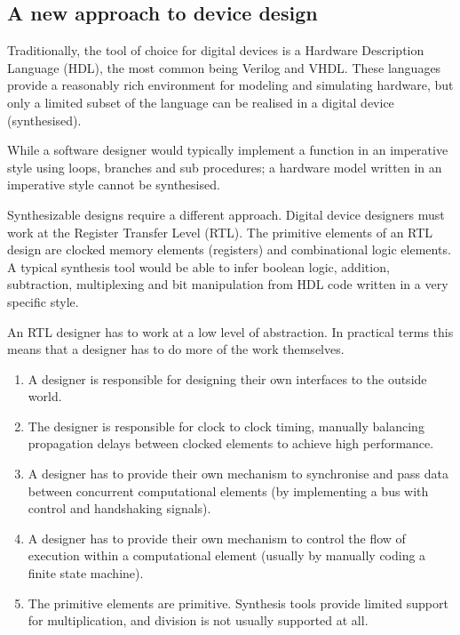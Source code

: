 \documentclass[letterpaper,10pt,english]{sphinxmanual}
\begin{document}
\subsection{A new approach to device design}
\label{introduction/index:a-new-approach-to-device-design}
Traditionally, the tool of choice for digital devices is a Hardware
Description Language (HDL), the most common being Verilog and VHDL. These
languages provide a reasonably rich environment for modeling and simulating
hardware, but only a limited subset of the language can be realised in a
digital device (synthesised).

While a software designer would typically implement a function in an
imperative style using loops, branches and sub procedures; a hardware model
written in an imperative style cannot be synthesised.

Synthesizable designs require a different approach. Digital device designers
must work at the Register Transfer Level (RTL). The primitive elements of an
RTL design are clocked memory elements (registers) and combinational logic
elements. A typical synthesis tool would be able to infer boolean logic,
addition, subtraction, multiplexing and bit manipulation from HDL code
written in a very specific style.

An RTL designer has to work at a low level of abstraction. In practical
terms this means that a designer has to do more of the work themselves.
\begin{enumerate}
\item {} 
A designer is responsible for designing their own interfaces to
the outside world.

\item {} 
The designer is responsible for clock to clock timing, manually
balancing propagation delays between clocked elements to achieve
high performance.

\item {} 
A designer has to provide their own mechanism to synchronise and
pass data between concurrent computational elements (by
implementing a bus with control and handshaking signals).

\item {} 
A designer has to provide their own mechanism to control the flow
of execution within a computational element (usually by manually
coding a finite state machine).

\item {} 
The primitive elements are primitive. Synthesis tools provide
limited support for multiplication, and division is not usually
supported at all.

\end{enumerate}
\end{document}
